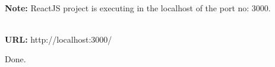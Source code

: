 \documentclass{article}
\begin{document}
\noindent \textbf{}

\noindent \textbf{}

\noindent \\
\textbf{Note:} ReactJS project is executing in the localhost of the port no: 3000. 

\noindent \\
\textbf{URL: }http://localhost:3000/

\noindent 

\noindent Done.
\end{document}
